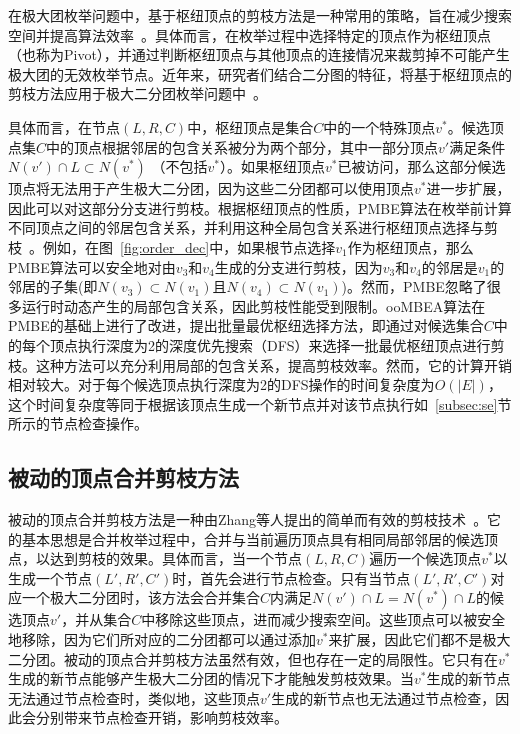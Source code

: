 在极大团枚举问题中，基于枢纽顶点的剪枝方法是一种常用的策略，旨在减少搜索空间并提高算法效率~\cite{MCEdegeneracy10}。具体而言，在枚举过程中选择特定的顶点作为枢纽顶点（也称为Pivot），并通过判断枢纽顶点与其他顶点的连接情况来裁剪掉不可能产生极大团的无效枚举节点。近年来，研究者们结合二分图的特征，将基于枢纽顶点的剪枝方法应用于极大二分团枚举问题中~\cite{PMBE20,ooMBE22}。

具体而言，在节点$(L,R,C)$中，枢纽顶点是集合$C$中的一个特殊顶点$v^*$。候选顶点集$C$中的顶点根据邻居的包含关系被分为两个部分，其中一部分顶点$v'$满足条件$N(v') \cap L \subset N(v^*)$ （不包括$v^*$）。如果枢纽顶点$v^*$已被访问，那么这部分候选顶点将无法用于产生极大二分团，因为这些二分团都可以使用顶点$v^*$进一步扩展，因此可以对这部分分支进行剪枝。根据枢纽顶点的性质，PMBE算法在枚举前计算不同顶点之间的邻居包含关系，并利用这种全局包含关系进行枢纽顶点选择与剪枝~\cite{PMBE20}。例如，在图~\ref{fig:order_dec}中，如果根节点选择$v_1$作为枢纽顶点，那么PMBE算法可以安全地对由$v_3$和$v_4$生成的分支进行剪枝，因为$v_3$和$v_4$的邻居是$v_1$的邻居的子集(即$N(v_3)\subset N(v_1)$且$N(v_4)\subset N(v_1)$)。然而，PMBE忽略了很多运行时动态产生的局部包含关系，因此剪枝性能受到限制。ooMBEA算法在PMBE的基础上进行了改进，提出批量最优枢纽选择方法，即通过对候选集合$C$中的每个顶点执行深度为2的深度优先搜索（DFS）来选择一批最优枢纽顶点进行剪枝。这种方法可以充分利用局部的包含关系，提高剪枝效率。然而，它的计算开销相对较大。对于每个候选顶点执行深度为2的DFS操作的时间复杂度为$O(|E|)$，这个时间复杂度等同于根据该顶点生成一个新节点并对该节点执行如~\ref{subsec:se}节所示的节点检查操作。


\subsection{被动的顶点合并剪枝方法}
\label{subsec:pmp}

被动的顶点合并剪枝方法是一种由Zhang等人提出的简单而有效的剪枝技术~\cite{iMBEA14}。它的基本思想是合并枚举过程中，合并与当前遍历顶点具有相同局部邻居的候选顶点，以达到剪枝的效果。具体而言，当一个节点$(L, R, C)$遍历一个候选顶点$v^*$以生成一个节点$(L', R', C')$时，首先会进行节点检查。只有当节点$(L', R', C')$对应一个极大二分团时，该方法会合并集合$C$内满足$N(v') \cap L = N(v^*) \cap L$的候选顶点$v'$，并从集合$C$中移除这些顶点，进而减少搜索空间。这些顶点可以被安全地移除，因为它们所对应的二分团都可以通过添加$v^*$来扩展，因此它们都不是极大二分团。被动的顶点合并剪枝方法虽然有效，但也存在一定的局限性。它只有在$v^*$生成的新节点能够产生极大二分团的情况下才能触发剪枝效果。当$v^*$生成的新节点无法通过节点检查时，类似地，这些顶点$v'$生成的新节点也无法通过节点检查，因此会分别带来节点检查开销，影响剪枝效率。

